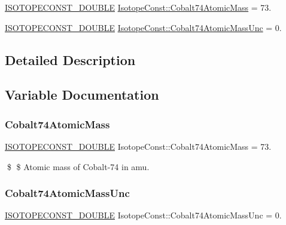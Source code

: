 \begin{DoxyCompactItemize}
\item 
\mbox{\hyperlink{group___isotope_const-_macros_ga8f45a7272ce02c0b4c65c44636ed719a}{I\+S\+O\+T\+O\+P\+E\+C\+O\+N\+S\+T\+\_\+\+D\+O\+U\+B\+LE}} \mbox{\hyperlink{group___isotope_const-_cobalt-_co74_ga0e1e90e79623e30255c7be6beac1eab6}{Isotope\+Const\+::\+Cobalt74\+Atomic\+Mass}} = 73.
\item 
\mbox{\hyperlink{group___isotope_const-_macros_ga8f45a7272ce02c0b4c65c44636ed719a}{I\+S\+O\+T\+O\+P\+E\+C\+O\+N\+S\+T\+\_\+\+D\+O\+U\+B\+LE}} \mbox{\hyperlink{group___isotope_const-_cobalt-_co74_ga572b7a8ac23e07653b6092bb873c45d3}{Isotope\+Const\+::\+Cobalt74\+Atomic\+Mass\+Unc}} = 0.
\end{DoxyCompactItemize}


\subsection{Detailed Description}


\subsection{Variable Documentation}
\mbox{\label{group___isotope_const-_cobalt-_co74_ga0e1e90e79623e30255c7be6beac1eab6}} 
\subsubsection{\texorpdfstring{Cobalt74\+Atomic\+Mass}{Cobalt74AtomicMass}}
{\footnotesize\ttfamily \mbox{\hyperlink{group___isotope_const-_macros_ga8f45a7272ce02c0b4c65c44636ed719a}{I\+S\+O\+T\+O\+P\+E\+C\+O\+N\+S\+T\+\_\+\+D\+O\+U\+B\+LE}} Isotope\+Const\+::\+Cobalt74\+Atomic\+Mass = 73.}

\$ \$ Atomic mass of Cobalt-\/74 in amu. \mbox{\label{group___isotope_const-_cobalt-_co74_ga572b7a8ac23e07653b6092bb873c45d3}} 
\subsubsection{\texorpdfstring{Cobalt74\+Atomic\+Mass\+Unc}{Cobalt74AtomicMassUnc}}
{\footnotesize\ttfamily \mbox{\hyperlink{group___isotope_const-_macros_ga8f45a7272ce02c0b4c65c44636ed719a}{I\+S\+O\+T\+O\+P\+E\+C\+O\+N\+S\+T\+\_\+\+D\+O\+U\+B\+LE}} Isotope\+Const\+::\+Cobalt74\+Atomic\+Mass\+Unc = 0.}

